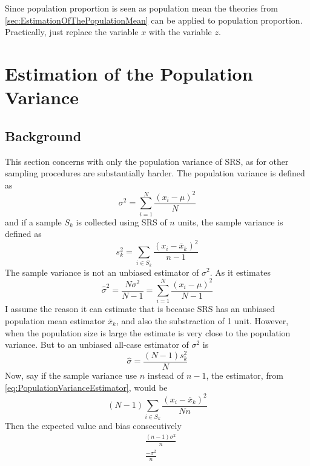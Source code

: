 Since population proportion is seen as population mean the theories from \cref{sec:EstimationOfThePopulationMean} can be applied to population proportion. Practically, just replace the variable $x$ with the variable $z$.

\section{Estimation of the Population Variance}
\subsection{Background}
This section concerns with only the population variance of SRS, as for other sampling procedures are substantially harder. The population variance is defined as
\begin{equation*}
    \sigma^2=\sum_{i=1}^{N}\frac{(x_i-\mu)^2}{N}
\end{equation*}
and if a sample $S_k$ is collected using SRS of $n$ units, the sample variance is defined as
\begin{equation*}
    s^2_k=\sum_{i\in S_k}\frac{(x_i-\bar{x}_k)^2}{n-1}
\end{equation*}
The sample variance is not an unbiased estimator of $\sigma^2$. As it estimates
\begin{equation*}
    \hat{\sigma}^2=\frac{N\sigma^2}{N-1}=\sum_{i=1}^{N}\frac{(x_i-\mu)^2}{N-1}
\end{equation*}
I assume the reason it can estimate that is because SRS has an unbiased population mean estimator $\bar{x}_k$, and also the substraction of 1 unit. However, when the population size is large the estimate is very close to the population variance.
But to an unbiased all-case estimator of $\sigma^2$ is
\begin{equation}\label{eq:PopulationVarianceEstimator}
    \hat{\sigma}=\frac{(N-1)s^2_k}{N} 
\end{equation}
Now, say if the sample variance use $n$ instead of $n-1$, the estimator, from \cref{eq:PopulationVarianceEstimator}, would be
\begin{equation}
    (N-1)\sum_{i\in S_k}\frac{(x_i-\bar{x}_k)^2}{Nn}
\end{equation}
Then the expected value and bias consecutively 
\begin{equation}
    \begin{aligned}
        &\frac{(n-1)\sigma^2}{n}\\
        &\frac{-\sigma^2}{n}
    \end{aligned}
\end{equation}
